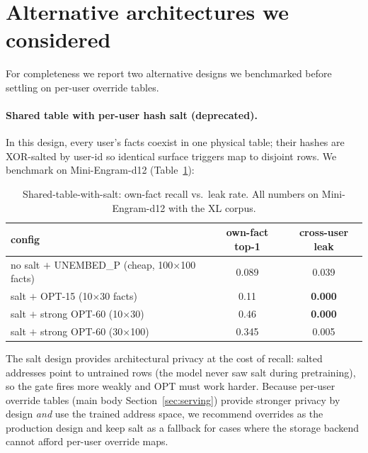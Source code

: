 \documentclass[11pt]{article}
\begin{document}
\section{Alternative architectures we considered}
\label{app:alt}

For completeness we report two alternative designs we benchmarked
before settling on per-user override tables.

\paragraph{Shared table with per-user hash salt (deprecated).}
In this design, every user's facts coexist in one physical table;
their hashes are XOR-salted by user-id so identical surface
triggers map to disjoint rows. We benchmark on Mini-Engram-d12
(Table~\ref{tab:salt-design}):

\begin{table}[t]
  \centering
  \caption{Shared-table-with-salt: own-fact recall vs.\ leak rate.
  All numbers on Mini-Engram-d12 with the XL corpus.}
  \label{tab:salt-design}
  \begin{tabular}{lcc}
    \toprule
    config & own-fact top-1 & cross-user leak \\
    \midrule
    no salt $+$ UNEMBED\_P (cheap, 100$\times$100 facts) & 0.089 & 0.039 \\
    salt $+$ OPT-15 (10$\times$30 facts) & 0.11 & \textbf{0.000} \\
    salt $+$ strong OPT-60 (10$\times$30) & 0.46 & \textbf{0.000} \\
    salt $+$ strong OPT-60 (30$\times$100) & 0.345 & 0.005 \\
    \bottomrule
  \end{tabular}
\end{table}

The salt design provides architectural privacy at the cost of
recall: salted addresses point to untrained rows (the model
never saw salt during pretraining), so the gate fires more
weakly and OPT must work harder. Because per-user override
tables (main body Section~\ref{sec:serving}) provide stronger
privacy by design \emph{and} use the trained address
space, we recommend overrides as the production design and keep
salt as a fallback for cases where the storage backend cannot
afford per-user override maps.
\end{document}
